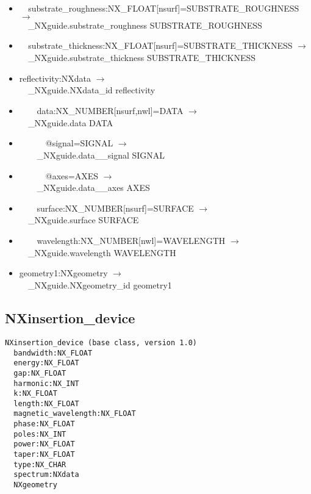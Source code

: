 \documentclass[11pt]{article}
\begin{document}
{{\begin{itemize}
\item{\verb|  |substrate\_roughness:NX\_FLOAT[nsurf]=SUBSTRATE\_ROUGHNESS $\rightarrow$\\
\verb|  |\_NXguide.substrate\_roughness SUBSTRATE\_ROUGHNESS}

\item{\verb|  |substrate\_thickness:NX\_FLOAT[nsurf]=SUBSTRATE\_THICKNESS $\rightarrow$\\
\verb|  |\_NXguide.substrate\_thickness SUBSTRATE\_THICKNESS}

\item{reflectivity:NXdata $\rightarrow$\\
\verb|  |\_NXguide.NXdata\_id reflectivity}

\item{\verb|    |data:NX\_NUMBER[nsurf,nwl]=DATA $\rightarrow$\\
\verb|  |\_NXguide.data DATA}

\item{\verb|      |@signal=SIGNAL $\rightarrow$\\
\verb|    |\_NXguide.data\_\_signal SIGNAL}

\item{\verb|      |@axes=AXES $\rightarrow$\\
\verb|    |\_NXguide.data\_\_axes AXES}

\item{\verb|    |surface:NX\_NUMBER[nsurf]=SURFACE $\rightarrow$\\
\verb|  |\_NXguide.surface SURFACE}

\item{\verb|    |wavelength:NX\_NUMBER[nwl]=WAVELENGTH $\rightarrow$\\
\verb|  |\_NXguide.wavelength WAVELENGTH}

\item{geometry1:NXgeometry $\rightarrow$\\
\verb|  |\_NXguide.NXgeometry\_id geometry1}
\end{itemize}
\subsection{NXinsertion\_device}

\begin{verbatim}
NXinsertion_device (base class, version 1.0)
  bandwidth:NX_FLOAT
  energy:NX_FLOAT
  gap:NX_FLOAT
  harmonic:NX_INT
  k:NX_FLOAT
  length:NX_FLOAT
  magnetic_wavelength:NX_FLOAT
  phase:NX_FLOAT
  poles:NX_INT
  power:NX_FLOAT
  taper:NX_FLOAT
  type:NX_CHAR
  spectrum:NXdata
  NXgeometry
\end{verbatim}

}}
\end{document}
